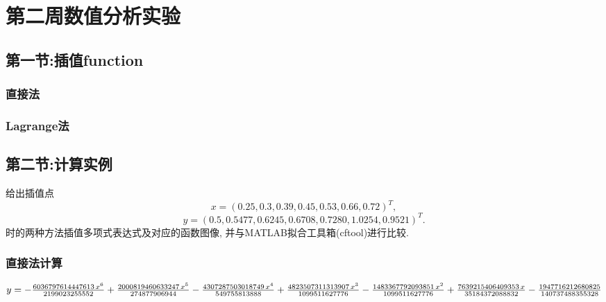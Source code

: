 \section{第二周数值分析实验}
\subsection{第一节:插值function}
\subsubsection{直接法}

\subsubsection{Lagrange法}

\subsection{第二节:计算实例}
\begin{ex}
	给出插值点
	$$x = (0.25, 0.3, 0.39, 0.45, 0.53, 0.66, 0.72)^T,$$  
	$$y = (0.5, 0.5477, 0.6245, 0.6708, 0.7280, 1.0254, 0.9521)^T .$$ 
	时的两种方法插值多项式表达式及对应的函数图像, 并与MATLAB拟合工具箱(cftool)进行比较.
\end{ex}
\subsubsection{直接法计算}

\qa $y=-\frac{6036797614447613\,x^6}{2199023255552}+\frac{2000819460633247\,x^5}{274877906944}-\frac{4307287503018749\,x^4}{549755813888}\\+\frac{4823507311313907\,x^3}{1099511627776}-\frac{1483367792093851\,x^2}{1099511627776}+\frac{7639215406409353\,x}{35184372088832}-\frac{1947716212680825}{140737488355328}$
